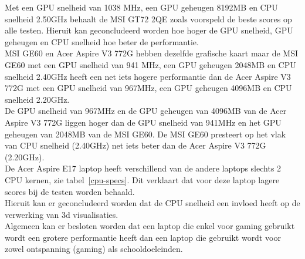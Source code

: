 Met een GPU snelheid van 1038 MHz, een GPU geheugen 8192MB en
CPU snelheid 2.50GHz behaalt de MSI GT72 2QE zoals voorspeld de beste
scores op alle testen. Hieruit kan geconcludeerd worden hoe hoger de GPU snelheid, GPU geheugen en CPU snelheid hoe beter de performantie.\\
MSI GE60 en Acer Aspire V3 772G  hebben dezelfde grafische kaart maar de MSI GE60 met  een GPU snelheid van 941 MHz, een GPU geheugen 2048MB en CPU snelheid 2.40GHz heeft een net iets hogere performantie dan de Acer Aspire V3 772G met een GPU snelheid van 967MHz, een GPU geheugen 4096MB en CPU snelheid 2.20GHz.\\
De GPU snelheid van 967MHz en de GPU geheugen van 4096MB van de Acer Aspire V3 772G liggen hoger dan de GPU snelheid van 941MHz en het GPU geheugen van 2048MB van de MSI GE60. De MSI GE60 presteert op het vlak van CPU snelheid (2.40GHz) net iets beter dan de Acer Aspire V3 772G (2.20GHz).\\
De Acer Aspire E17 laptop heeft verschillend van de andere laptops slechts 2 CPU kernen, zie tabel~\ref{cpu-specs}. Dit verklaart dat voor deze laptop lagere scores bij de testen worden behaald.\\
Hieruit kan er geconcludeerd worden dat de CPU snelheid een invloed heeft op de verwerking van 3d visualisaties.\\
Algemeen kan er besloten worden dat een laptop die enkel voor gaming gebruikt wordt een grotere performantie heeft dan een laptop die gebruikt wordt voor zowel ontspanning (gaming) als schooldoeleinden.
